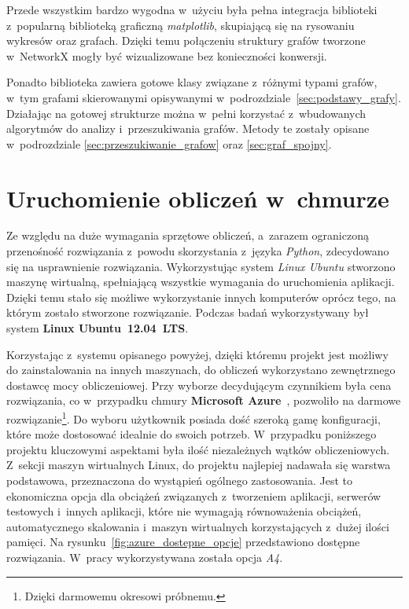 \documentclass[twoside,12pt]{report}
\begin{document}
Przede wszystkim bardzo wygodna w~użyciu była pełna integracja biblioteki z~popularną biblioteką graficzną \textit{matplotlib}, skupiającą się na rysowaniu wykresów oraz grafach. Dzięki temu połączeniu struktury grafów tworzone w~NetworkX mogły być wizualizowane bez konieczności konwersji. 

Ponadto biblioteka zawiera gotowe klasy związane z~różnymi typami grafów, w~tym grafami skierowanymi opisywanymi w~podrozdziale~\ref{sec:podstawy_grafy}. Działając na gotowej strukturze można w~pełni korzystać z~wbudowanych algorytmów do analizy i~przeszukiwania grafów. Metody te zostały opisane w~podrozdziale \ref{sec:przeszukiwanie_grafow} oraz \ref{sec:graf_spojny}.

\section{Uruchomienie obliczeń w~chmurze}
Ze względu na duże wymagania sprzętowe obliczeń, a~zarazem ograniczoną przenośność rozwiązania z~powodu skorzystania z~języka \textit{Python}, zdecydowano się na usprawnienie rozwiązania. Wykorzystując system \textit{Linux Ubuntu} stworzono maszynę wirtualną, spełniającą wszystkie wymagania do uruchomienia aplikacji. Dzięki temu stało się możliwe wykorzystanie innych komputerów oprócz tego, na którym zostało stworzone rozwiązanie. Podczas badań wykorzystywany był system \textbf{Linux Ubuntu~12.04~LTS}\cite{ubuntu}.

Korzystając z~systemu opisanego powyżej, dzięki któremu projekt jest możliwy do zainstalowania na innych maszynach, do obliczeń wykorzystano zewnętrznego dostawcę mocy obliczeniowej. Przy wyborze decydującym czynnikiem była cena rozwiązania, co w~przypadku chmury\textbf{ Microsoft Azure}~\cite{azure}, pozwoliło na darmowe rozwiązanie\footnote{Dzięki darmowemu okresowi próbnemu.}. Do wyboru użytkownik posiada dość szeroką gamę konfiguracji, które może dostosować idealnie do swoich potrzeb. W~przypadku poniższego projektu kluczowymi aspektami była ilość niezależnych wątków obliczeniowych. Z~sekcji maszyn wirtualnych Linux, do projektu najlepiej nadawała się warstwa podstawowa, przeznaczona do wystąpień ogólnego zastosowania. Jest to ekonomiczna opcja dla obciążeń związanych z~tworzeniem aplikacji, serwerów testowych i~innych aplikacji, które nie wymagają równoważenia obciążeń, automatycznego skalowania i~maszyn wirtualnych korzystających z~dużej ilości pamięci. Na rysunku~\ref{fig:azure_dostepne_opcje} przedstawiono dostępne rozwiązania. W~pracy wykorzystywana została opcja \textit{A4}.
\end{document}
